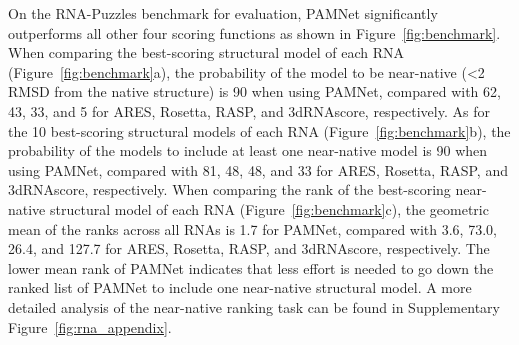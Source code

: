 \documentclass[fleqn,10pt]{wlscirep}
\newcommand{\method}{PAMNet\xspace}
\begin{document}
On the RNA-Puzzles benchmark for evaluation, \method significantly outperforms all other four scoring functions as shown in Figure~\ref{fig:benchmark}. When comparing the best-scoring structural model of each RNA (Figure~\ref{fig:benchmark}a), the probability of the model to be near-native (<2 RMSD from the native structure) is 90 when using \method, compared with 62, 43, 33, and 5 for ARES, Rosetta, RASP, and 3dRNAscore, respectively. As for the 10 best-scoring structural models of each RNA (Figure~\ref{fig:benchmark}b), the probability of the models to include at least one near-native model is 90 when using \method, compared with 81, 48, 48, and 33 for ARES, Rosetta, RASP, and 3dRNAscore, respectively. When comparing the rank of the best-scoring near-native structural model of each RNA (Figure~\ref{fig:benchmark}c), the geometric mean of the ranks across all RNAs is 1.7 for \method, compared with 3.6, 73.0, 26.4, and 127.7 for ARES, Rosetta, RASP, and 3dRNAscore, respectively. The lower mean rank of \method indicates that less effort is needed to go down the ranked list of \method to include one near-native structural model. A more detailed analysis of the near-native ranking task can be found in Supplementary Figure~\ref{fig:rna_appendix}. 
\end{document}
